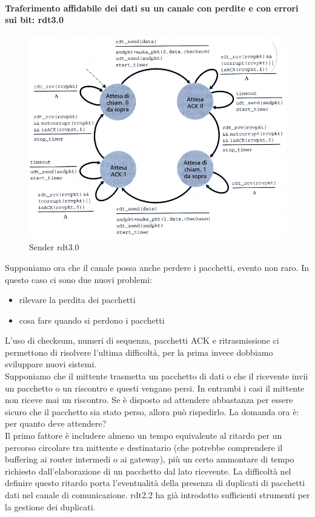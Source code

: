 \documentclass[11pt,a4paper]{book}
\begin{document}
\paragraph{Traferimento affidabile dei dati su un canale con perdite e con errori sui bit: rdt3.0}
\begin{figure}
	\includegraphics[scale=0.6]{img/021.png}
	\caption{Sender rdt3.0}
\end{figure}
Supponiamo ora che il canale possa anche perdere i pacchetti, evento non raro. In questo caso ci sono due nuovi problemi:
\begin{itemize}
	\item rilevare la perdita dei pacchetti
	\item cosa fare quando si perdono i pacchetti
\end{itemize}
L'uso di checksum, numeri di sequenza, pacchetti ACK e ritrasmissione ci permettono di risolvere l'ultima difficoltà, per la prima invece dobbiamo sviluppare nuovi sistemi. \\
Supponiamo che il mittente trasmetta un pacchetto di dati o che il ricevente invii un pacchetto o un riscontro e questi vengano persi. In entrambi i casi il mittente non riceve mai un riscontro. Se è disposto ad attendere abbastanza per essere sicuro che il pacchetto sia stato perso, allora può rispedirlo. La domanda ora è: per quanto deve attendere? \\
Il primo fattore è includere almeno un tempo equivalente al ritardo per un percorso circolare tra mittente e destinatario (che potrebbe comprendere il buffering ai router intermedi o ai gateway), più un certo ammontare di tempo richiesto dall'elaborazione di un pacchetto dal lato ricevente. La difficoltà nel definire questo ritardo porta l'eventualità della presenza di duplicati di pacchetti dati nel canale di comunicazione. rdt2.2 ha già introdotto sufficienti strumenti per la gestione dei duplicati. \\
\end{document}
